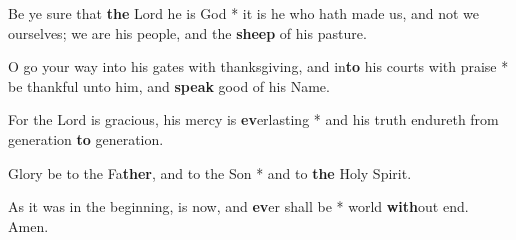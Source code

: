\begin{multicols}{2}
	Be ye sure that \textbf{the} Lord he is God * it is he who hath made us, and not we ourselves; we are his people, and the \textbf{sheep} of his pasture.
	
	O go your way into his gates with thanksgiving, and in\textbf{to} his courts with praise * be thankful unto him, and \textbf{speak} good of his Name.
	
	For the Lord is gracious, his mercy is \textbf{ev}erlasting * and his truth endureth from generation \textbf{to} generation.
	
	Glory be to the Fa\textbf{ther}, and to the Son * and to \textbf{the} Holy Spirit.
	
	As it was in the beginning, is now, and \textbf{ev}er shall be * world \textbf{with}out end. Amen.
\end{multicols}